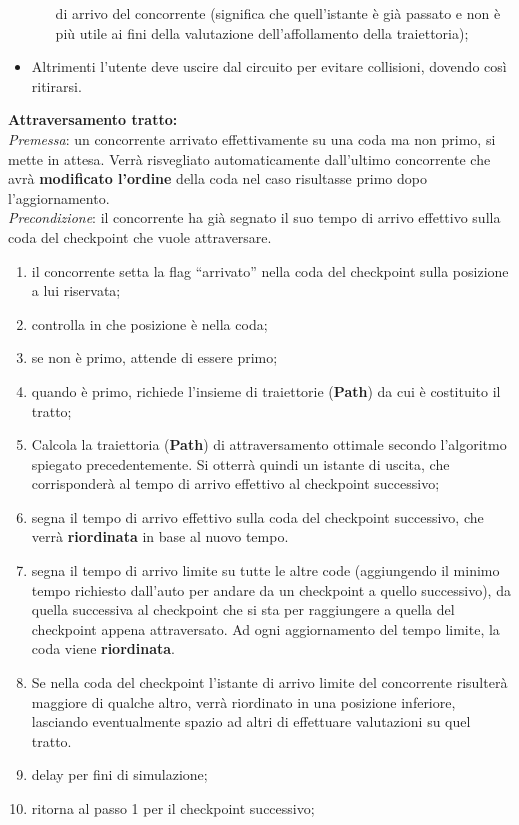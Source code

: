 \begin{description}
\begin{itemize}
\begin{itemize}
di arrivo del concorrente (significa che quell'istante è già passato e non è più utile ai fini della valutazione dell'affollamento
della traiettoria);
\end{itemize}
\item Altrimenti l'utente deve uscire dal circuito per evitare collisioni, dovendo così ritirarsi.
\end{itemize}
\item{\textbf{Attraversamento tratto:}}\\
\emph{Premessa}: un concorrente arrivato effettivamente su una coda ma non primo, si mette in attesa. 
Verrà risvegliato automaticamente dall'ultimo concorrente che avrà \textbf{modificato l'ordine} della coda nel
caso risultasse primo dopo l'aggiornamento.\\
\emph{Precondizione}: il concorrente ha gi\`{a} segnato il suo tempo di arrivo
effettivo sulla coda del checkpoint che vuole attraversare.
\begin{enumerate}
\item il concorrente setta la flag ``arrivato'' nella coda del checkpoint sulla
posizione a lui riservata;
\item controlla in che posizione \`{e} nella coda;
\item se non \`{e} primo, attende di essere primo;
\item quando \`{e} primo, richiede l'insieme di traiettorie (\textbf{Path}) da
cui \`{e} costituito il tratto;
\item Calcola la traiettoria (\textbf{Path}) di attraversamento ottimale secondo l'algoritmo spiegato precedentemente.
Si otterrà quindi un istante di uscita, che corrisponderà al tempo di arrivo effettivo al checkpoint successivo;
\item segna il tempo di arrivo effettivo sulla coda del checkpoint successivo, che verr\`{a}
\textbf{riordinata} in base al nuovo tempo.
\item segna il tempo di arrivo limite su tutte le altre code (aggiungendo il minimo tempo richiesto dall'auto
per andare da un checkpoint a quello successivo), da quella
successiva al checkpoint che si sta per raggiungere a quella del checkpoint
appena attraversato. Ad ogni aggiornamento del tempo limite, la coda viene
\textbf{riordinata}.
\item Se nella coda del checkpoint l'istante di arrivo limite del concorrente risulterà maggiore di qualche altro, 
verrà riordinato in una posizione inferiore, lasciando eventualmente spazio
ad altri di effettuare valutazioni su quel tratto.
\item delay per fini di simulazione;
\item ritorna al passo 1 per il checkpoint successivo;
\end{enumerate}
\end{description}
